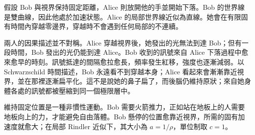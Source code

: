 假設 Bob 與視界保持固定距離，Alice 則放開他的手並開始下落。Bob 的世界線是雙曲線，因此他處於加速狀態。Alice 的局部世界線近似為直線。她會在有限固有時間內穿越零邊界，穿越時不會遇到任何局部的不連續。

兩人的因果描述並不對稱。Alice 穿越視界後，她發出的光無法到達 Bob；但有一段時間，Bob 發出的光仍能到達 Alice。Bob 收到的訊號來自 Alice 下落過程中愈來愈早的時刻。訊號抵達的間隔愈拉愈長，頻率發生紅移，強度也逐漸減弱。以 Schwarzschild 時間描述，Bob 永遠看不到穿越本身；Alice 看起來會漸漸靠近視界，並在那裡逐漸扁平化。這不是說她的鼻子扁了，而後腦仍維持原狀；來自她身體各處的訊號都被壓縮到同一個極限層中。

\begin{classroomqa}
\end{classroomqa}

\begin{classroomqa}
\end{classroomqa}

維持固定位置是一種非慣性運動。Bob 需要火箭推力，正如站在地板上的人需要地板向上的力，才能避免自由落體。Bob 懸停的位置愈靠近視界，所需的固有加速度就愈大；在局部 Rindler 近似下，其大小為 \(a=1/\rho\)，單位制取 \(c=1\)。

\begin{classroomqa}
\end{classroomqa}

\begin{classroomqa}
\end{classroomqa}

